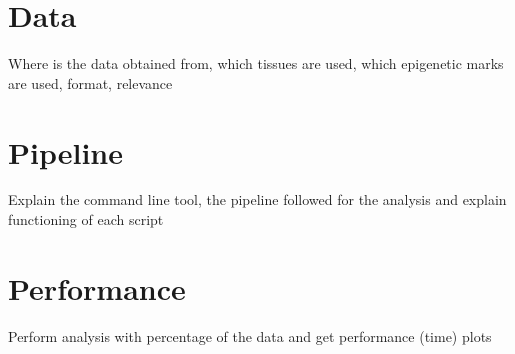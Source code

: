 \section{Data}

Where is the data obtained from, which tissues are used, which epigenetic marks are used, format, relevance


\section{Pipeline}

Explain the command line tool, the pipeline followed for the analysis and explain functioning of each script

\section{Performance}

Perform analysis with percentage of the data and get performance (time) plots
